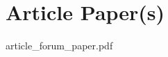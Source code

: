 	\ifVita
	
	\fi
	\cleardoublepage
	
	\ifIndex
	\printindex
	\fi
	
	\chapter{Article Paper(s)} 
	\label{ch:article_paper}
	\cleardoublepage
	{
	\ClearWallPaper
	
	{article_forum_paper.pdf}
	}
	\cleardoublepage


